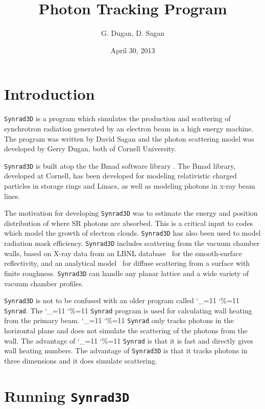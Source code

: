\documentclass[11pt]{article}
\title{ \srthree Photon Tracking Program}
\author{G. Dugan, D. Sagan}
\date{April 30, 2013}
\newcommand{\srthree}{\texttt{Synrad3D}\xspace}
\newcommand\ttcmd{\begingroup\catcode`\_=11 \catcode`\%=11 \dottcmd}
\newcommand\dottcmd[1]{\texttt{#1}\endgroup}
\newcommand{\vn}{\ttcmd}
\begin{document}
\maketitle

\tableofcontents

\section{Introduction} 
\label{s:intro}

\srthree is a program which simulates the production and scattering of
synchrotron radiation generated by an electron beam in a high energy
machine. The program was written by David Sagan and the photon
scattering model was developed by Gerry Dugan, both of Cornell
University.

\srthree is built atop the the Bmad software library
\cite{b:bmad}. The Bmad library, developed at Cornell, has been
developed for modeling relativistic charged particles in storage rings
and Linacs, as well as modeling photons in x-ray beam lines.

The motivation for developing \srthree was to estimate the energy and
position distribution of where SR photons are absorbed. This is a
critical input to codes which model the growth of electron clouds.
\srthree has also been used to model radiation mask efficiency.
\srthree includes scattering from the vacuum chamber walls, based on
X-ray data from an LBNL database~\cite{b:henke} for the smooth-surface
reflectivity, and an analytical model~\cite{b:beckmann,b:ogilvy} for
diffuse scattering from a surface with finite roughness. \srthree can
handle any planar lattice and a wide variety of vacuum chamber
profiles.

\srthree is not to be confused with an older program called
\vn{Synrad}. The \vn{Synrad} program is used for calculating wall
heating from the primary beam. \vn{Synrad} only tracks photons in the
horizontal plane and does not simulate the scattering of the photons
from the wall. The advantage of \vn{Synrad} is that it is fast and
directly gives wall heating numbers. The advantage of \srthree is that
it tracks photons in three dimensions and it does simulate scattering.

\section{Running \srthree} 
\label{s:run}
\end{document}

